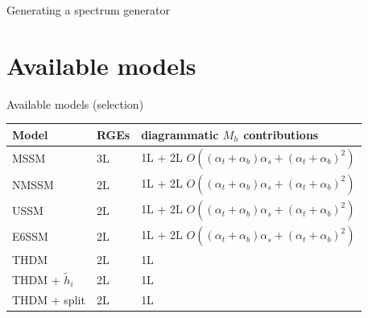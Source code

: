 \documentclass[hyperref={pdfpagelabels=false},ngerman]{beamer}
\newcommand{\Lagr}{\mathcal{L}}
\renewcommand{\emph}{\textbf}
\begin{document}
\begin{frame}{Generating a spectrum generator}
  \begin{figure}
    \centering
  \end{figure}
\end{frame}

\section{Available models}


\begin{frame}{Available models (selection)}
  \begin{table}
    \centering
    \begin{tabular}{llll}
      Model             & RGEs & \multicolumn{2}{l}{diagrammatic $M_h$ contributions} \\
      \midrule
      MSSM              & 3L   & \multicolumn{2}{l}{1L + 2L $O((\alpha_t + \alpha_b) \alpha_s + (\alpha_t + \alpha_b)^2)$} \\
      NMSSM             & 2L   & \multicolumn{2}{l}{1L + 2L $O((\alpha_t + \alpha_b) \alpha_s + (\alpha_t + \alpha_b)^2)$} \\
      USSM              & 2L   & \multicolumn{2}{l}{1L + 2L $O((\alpha_t + \alpha_b) \alpha_s + (\alpha_t + \alpha_b)^2)$} \\
      E6SSM             & 2L   & \multicolumn{2}{l}{1L + 2L $O((\alpha_t + \alpha_b) \alpha_s + (\alpha_t + \alpha_b)^2)$} \\
      THDM              & 2L   & 1L \\
      THDM + $\tilde{h}_i$ & 2L   & 1L \\
      THDM + split      & 2L   & 1L \\
    \end{tabular}
  \end{table}
\end{frame}
\end{document}
